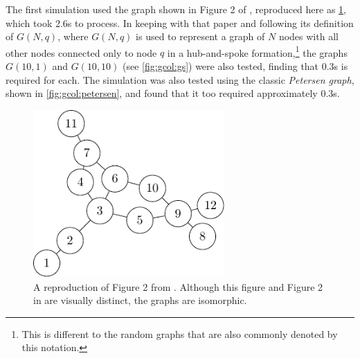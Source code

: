 
The first simulation used the graph shown in Figure 2 of \cite{Gheorghe2013}, reproduced here as \cref{fig:gcol:gheorghefig2}, which took 2.6s to process.  In keeping with that paper and following its definition of \(G(N,q)\), where \(G(N,q)\) is used to represent a graph of \(N\) nodes with all other nodes connected only to node \(q\) in a hub-and-spoke formation,\footnote{This is different to the random graphs that are also commonly denoted by this notation.} the graphs \(G(10,1)\) and \(G(10,10)\) (see \cref{fig:gcol:gs}) were also tested, finding that 0.3s is required for each.  The simulation was also tested using the classic \emph{Petersen graph}, shown in \cref{fig:gcol:petersen}, and found that it too required approximately 0.3s.

\begin{figure}
    \centering
    \includegraphics[width=0.65\textwidth]{chapters/gcol/figs/gheorghe-figure-2-figure0.pdf}
    \caption[A reproduction of the graph in Figure 2 of \cite{Gheorghe2013}]{\label{fig:gcol:gheorghefig2}A reproduction of Figure 2 from \cite{Gheorghe2013}.  Although this figure and Figure 2 in \cite{Gheorghe2013} are visually distinct, the graphs are isomorphic.}
\end{figure}

